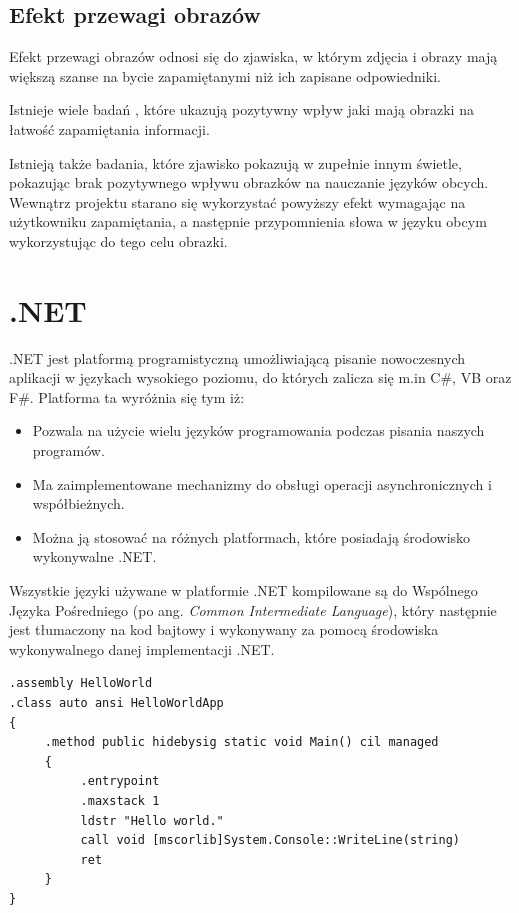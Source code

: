 \section{Efekt przewagi obrazów}

Efekt przewagi obrazów odnosi się do zjawiska, w którym zdjęcia i obrazy mają większą szanse na bycie zapamiętanymi niż ich zapisane odpowiedniki. 

Istnieje wiele badań \cite{PicturesRocks}\cite{SuperPictures}, które ukazują pozytywny wpływ jaki mają obrazki na łatwość zapamiętania informacji. 

Istnieją także badania, które zjawisko pokazują w zupełnie innym świetle, pokazując brak pozytywnego wpływu obrazków na nauczanie języków obcych\cite{OverConfidence}.
\\
Wewnątrz projektu starano się wykorzystać powyższy efekt wymagając na użytkowniku zapamiętania, a następnie przypomnienia słowa w języku obcym wykorzystując do tego celu obrazki.







{\let\cleardoublepage\relax \chapter{.NET}}


.NET jest platformą programistyczną umożliwiającą pisanie nowoczesnych aplikacji w językach wysokiego poziomu, do których zalicza się m.in C\#, VB oraz F\#. Platforma ta wyróżnia się tym iż:
\begin{itemize}
	\item Pozwala na użycie wielu języków programowania podczas pisania naszych programów.
	\item Ma zaimplementowane mechanizmy do obsługi operacji asynchronicznych i współbieżnych.
	\item Można ją stosować na różnych platformach, które posiadają środowisko wykonywalne .NET.
\end{itemize}
Wszystkie języki używane w platformie .NET kompilowane są do Wspólnego Języka Pośredniego (po ang. \textit{Common Intermediate Language}), który następnie jest tłumaczony na kod bajtowy i wykonywany za pomocą środowiska wykonywalnego danej implementacji .NET.

\begin{lstlisting}[frame=single, numbers=none,captionpos=b, 
caption={Przykładowy kod aplikacji "Hello World" w języku CIL}]
.assembly HelloWorld
.class auto ansi HelloWorldApp
{
     .method public hidebysig static void Main() cil managed
     {
          .entrypoint
          .maxstack 1
          ldstr "Hello world."
          call void [mscorlib]System.Console::WriteLine(string)
          ret
     }
}
\end{lstlisting}

